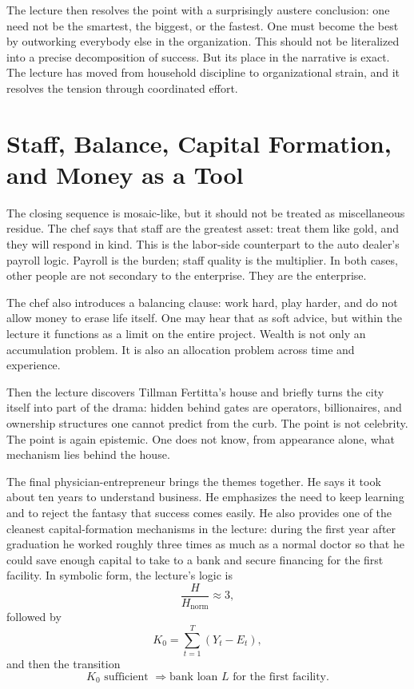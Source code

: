The lecture then resolves the point with a surprisingly austere conclusion: one need not be the smartest, the biggest, or the fastest. One must become the best by outworking everybody else in the organization. This should not be literalized into a precise decomposition of success. But its place in the narrative is exact. The lecture has moved from household discipline to organizational strain, and it resolves the tension through coordinated effort.

\section{Staff, Balance, Capital Formation, and Money as a Tool}

The closing sequence is mosaic-like, but it should not be treated as miscellaneous residue. The chef says that staff are the greatest asset: treat them like gold, and they will respond in kind. This is the labor-side counterpart to the auto dealer's payroll logic. Payroll is the burden; staff quality is the multiplier. In both cases, other people are not secondary to the enterprise. They are the enterprise.

The chef also introduces a balancing clause: work hard, play harder, and do not allow money to erase life itself. One may hear that as soft advice, but within the lecture it functions as a limit on the entire project. Wealth is not only an accumulation problem. It is also an allocation problem across time and experience.

Then the lecture discovers Tillman Fertitta's house and briefly turns the city itself into part of the drama: hidden behind gates are operators, billionaires, and ownership structures one cannot predict from the curb. The point is not celebrity. The point is again epistemic. One does not know, from appearance alone, what mechanism lies behind the house.

The final physician-entrepreneur brings the themes together. He says it took about ten years to understand business. He emphasizes the need to keep learning and to reject the fantasy that success comes easily. He also provides one of the cleanest capital-formation mechanisms in the lecture: during the first year after graduation he worked roughly three times as much as a normal doctor so that he could save enough capital to take to a bank and secure financing for the first facility. In symbolic form, the lecture's logic is
\begin{equation}
\frac{H}{H_{\text{norm}}} \approx 3,
\end{equation}
followed by
\begin{equation}
K_0 = \sum_{t=1}^{T} (Y_t - E_t),
\end{equation}
and then the transition
\begin{equation}
K_0 \text{ sufficient } \Longrightarrow \text{bank loan } L \text{ for the first facility.}
\end{equation}

